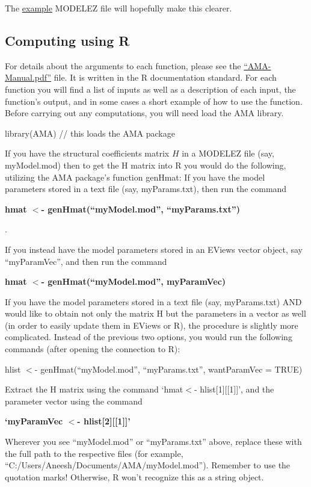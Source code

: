 \documentclass[12pt]{article}
\newcommand{\rcmd}[1]{
\vspace{0.2in}

{\bfseries #1}

\vspace{0.2in}
}
\begin{document}
The \hyperlink{exmpl}{example} MODELEZ file will hopefully make this clearer. \\

\subsection{Computing using R}
For details about the arguments to each function, please see the \href{AMA-Manual.pdf}{``AMA-Manual.pdf''} file.  It is written in the R documentation standard.  For each function you will find a list of inputs as well as a description of each input, the function's output, and in some cases a short example of how to use the function. \\

Before carrying out any computations, you will need  load the AMA library.  

library(AMA) // this loads the AMA package

If you have the structural coefficients matrix $H$ in a MODELEZ file (say, myModel.mod) then to get the H matrix into R you would do the following, utilizing the AMA package's function genHmat: 
If you have the model parameters stored in a text file (say, myParams.txt), then run the command 

\rcmd{  hmat $<$- genHmat(``myModel.mod'', ``myParams.txt'')}. 

If you instead have the model parameters stored in an EViews vector object, say ``myParamVec'', and then run the command 

\rcmd{  hmat $<$- genHmat(``myModel.mod'', myParamVec)}

If you have the model parameters stored in a text file (say, myParams.txt) AND would like to obtain not only the matrix H but the parameters in a vector as well (in order to easily update them in EViews or R), the procedure is slightly more complicated.  Instead of the previous two options, you would run the following commands (after opening the connection to R):

hlist $<$- genHmat(``myModel.mod'', ``myParams.txt'', wantParamVec = TRUE)

Extract the H matrix using the command `hmat$<$- hlist[1][[1]]', and the parameter vector using the command 

\rcmd{ `myParamVec $<$- hlist[2][[1]]' }


Wherever you see ``myModel.mod'' or ``myParams.txt'' above, replace these with the full path to the respective files (for example, ``C:/Users/Aneesh/Documents/AMA/myModel.mod'').  Remember to use the quotation marks! Otherwise, R won't recognize this as a string object. 
\end{document}
